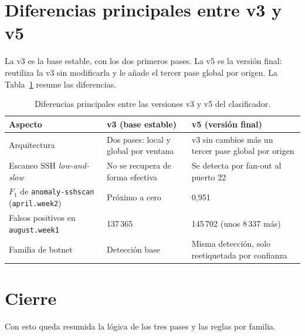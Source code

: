 \section{Diferencias principales entre v3 y v5}
\label{sec:apd_v3v5}

La v3 es la base estable, con los dos primeros pases. La v5 es la versión final: reutiliza la v3 sin modificarla y le añade el tercer pase global por origen. La Tabla~\ref{tab:apd_v3v5} resume las diferencias.

\begin{table}[ht]
\centering
\small
\begin{tabular}{|p{3.8cm}|p{4.4cm}|p{4.4cm}|}
\hline
\textbf{Aspecto} & \textbf{v3 (base estable)} & \textbf{v5 (versión final)} \\
\hline
Arquitectura & Dos pases: local y global por ventana & v3 sin cambios más un tercer pase global por origen \\
\hline
Escaneo SSH \emph{low-and-slow} & No se recupera de forma efectiva & Se detecta por fan-out al puerto 22 \\
\hline
$F_1$ de \texttt{anomaly-sshscan} (\texttt{april.week2}) & Próximo a cero & 0,951 \\
\hline
Falsos positivos en \texttt{august.week1} & 137\,365 & 145\,702 (unos 8\,337 más) \\
\hline
Familia de botnet & Detección base & Misma detección, solo reetiquetada por confianza \\
\hline
\end{tabular}
\caption{Diferencias principales entre las versiones v3 y v5 del clasificador.}
\label{tab:apd_v3v5}
\end{table}

\section{Cierre}
\label{sec:apd_cierre}

Con esto queda resumida la lógica de los tres pases y las reglas por familia.
